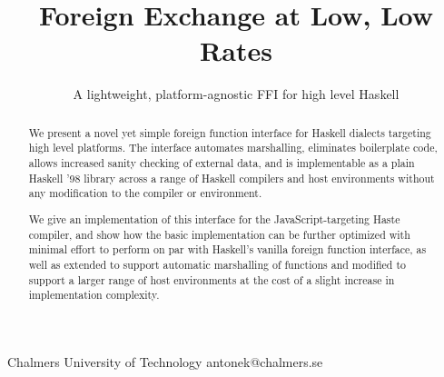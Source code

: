 \documentclass{sigplanconf}
\begin{document}
\setlength{\pdfpageheight}{\paperheight}
\setlength{\pdfpagewidth}{\paperwidth}

\exclusivelicense
{} 





\title{Foreign Exchange at Low, Low Rates}
\subtitle{A lightweight, platform-agnostic FFI for high level Haskell}

           {Chalmers University of Technology}
           {antonek@chalmers.se}

\maketitle

\begin{abstract}
  We present a novel yet simple foreign function interface for Haskell dialects
  targeting high level platforms. The interface automates marshalling,
  eliminates boilerplate code, allows increased sanity checking of external
  data, and is implementable as a plain Haskell '98 library across a range of
  Haskell compilers and host environments without any modification to the
  compiler or environment.
  
  We give an implementation of this interface for the JavaScript-targeting
  Haste compiler, and show how the basic implementation can be
  further optimized with minimal effort to perform on par with Haskell's
  vanilla foreign function interface, as well as extended to support automatic
  marshalling of functions and modified to support a larger range of host
  environments at the cost of a slight increase in implementation complexity.
\end{abstract}

\end{document}
